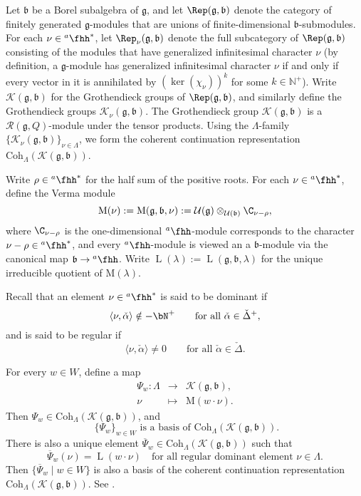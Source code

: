 \documentclass[12pt,a4paper]{amsart}
\newcommand{\BN}{{\mathbb {N}}}
\newcommand{\CK}{{\mathcal {K}}}
\newcommand{\CU}{{\mathcal {U}}}
\newcommand{\oL}{\operatorname{L}}
\newcommand{\g}{\mathfrak g}
\renewcommand{\b}{\mathfrak b}
\newcommand{\la}{\langle}
\newcommand{\ra}{\rangle}
\newcommand{\be}{\begin {equation}}
\newcommand{\ee}{\end {equation}}
\numberwithin{equation}{section}
\theoremstyle{remark}
\def\hha{{}^a\fhh}
\def\Coh{\mathrm{Coh}}
\begin{document}
Let $\b$ be a  Borel subalgebra of $\g$, and let $\Rep(\g,\b)$ denote the category of finitely generated $\g$-modules that are unions of finite-dimensional $\b$-submodules.
For each $\nu\in \hha^*$, let  $\Rep_\nu(\g,\b)$ denote the  full subcategory of $\Rep(\g,\b)$ consisting of the modules that have generalized infinitesimal character $\nu$ (by definition, a $\g$-module has  generalized infinitesimal character $\nu$ if and only if every vector in it is annihilated by $(\ker(\chi_\nu))^k$ for some $k\in \BN^+$).
Write $\CK(\g,\b)$ for the Grothendieck groups of $\Rep(\g,\b)$, and similarly define the Grothendieck groups $\CK_{\nu}(\g,\b)$.
The  Grothendieck group $\CK(\g,\b)$ is a $\mathcal R(\g,Q)$-module under the tensor products. Using the $\Lambda$-family   $\{\CK_\nu(\g,\b)\}_{\nu\in \Lambda}$, we form the coherent continuation representation $\Coh_{\Lambda}( \CK(\g,\b))$.






Write $\rho\in \hha^*$ for the half sum of the positive roots.
For each $\nu\in \hha^*$, define the Verma module
\[
  \mathrm M(\nu):=\mathrm M(\g,\b,\nu):=\CU(\g)\otimes_{\CU(\b)} \C_{\nu-\rho},
\]
where  $\C_{\nu-\rho}$ is the one-dimensional $\hha$-module corresponds to the character $\nu-\rho\in \hha^*$, and every $\hha$-module is viewed an a $\b$-module via the canonical map $\b\rightarrow \hha$. Write
$\oL(\lambda):=\oL(\g,\b,\lambda)$ for the unique irreducible quotient of $ \mathrm M(\lambda)$.

Recall that an element $\nu\in \hha^*$ is said to be dominant if
\be\label{dominant}
    \la \nu, \check \alpha\ra\notin -\bN^+ \qquad\textrm{for all $\check \alpha\in \check \Delta^+$},
  \ee
  and is said to be regular if
  \[
    \la \nu, \check \alpha\ra\neq 0 \qquad\textrm{for all $\check \alpha\in \check \Delta$}.
  \]



For every $w\in W$, define a map
\[
\begin{array}{rcl}
  \Psi_{w}: \Lambda&\rightarrow  &\CK(\g,\b), \\
   \nu&\mapsto& \mathrm M(w \cdot \nu).
   \end{array}
\]
Then $\Psi_w\in \Coh_{\Lambda}( \CK(\g,\b))$, and
\be\label{basis}
\textrm{ $\{\Psi_w\}_{w\in W}$ is a basis of $\Coh_{\Lambda}( \CK(\g,\b))$. }
\ee
There is also a unique element $\overline \Psi_w\in \Coh_{\Lambda}( \CK(\g,\b))$ such that
\[
  \overline \Psi_w(\nu)=\oL(w\cdot  \nu)\quad \textrm{for all regular dominant element $\nu\in \Lambda$}.
\]
Then $\{\overline \Psi_w\mid w\in W\}$ is  also a   basis of the coherent continuation representation $\Coh_{\Lambda}( \CK(\g,\b))$. See \cite[Section 7.10]{H}.
\end{document}
